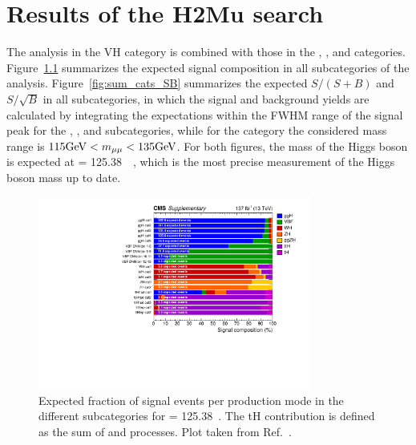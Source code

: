 \chapter{Results of the H2Mu search} \label{chp:hmm_results}

The analysis in the VH category is combined with those in the \ggH, \qqH, and \ttH categories.
Figure~\ref{fig:sum_cats_comp} summarizes the expected signal composition in all subcategories of the \hmm analysis.
Figure~\ref{fig:sum_cats_SB} summarizes the expected $S/(S+B)$ and $S/\sqrt{B}$ in all subcategories,
in which the signal and background yields are calculated by integrating the expectations within the FWHM range of the signal peak for the \ggH, \VH, and \ttH subcategories,
while for the \qqH category the considered mass range is $115 \mbox{GeV} < m_{\mu\mu} < 135 \mbox{GeV}$.
For both figures, the mass of the Higgs boson is expected at \mh = 125.38~\GeV~\cite{2020135425},
which is the most precise measurement of the Higgs boson mass up to date.

\begin{figure}[!htb]
    \centering
    \captionsetup{justification=justified}
    \includegraphics[width=0.80\textwidth]{pics/results/sig_composition.pdf}
    \caption{Expected fraction of signal events per production mode in the different subcategories for \mh = 125.38~\GeV.
             The tH contribution is defined as the sum of \tHq and \tHW processes.
             Plot taken from Ref.~\cite{Sirunyan_2021}.}
    \label{fig:sum_cats_comp}
\end{figure}

